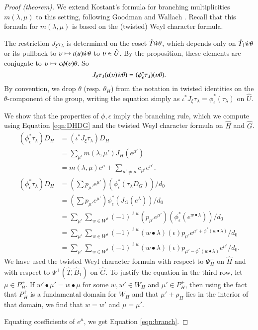 \begin{proof}[Proof (theorem)]
  We extend Kostant's formula for branching multiplicities
  $m(\lambda,\mu)$ to this setting, following Goodman and Wallach
  \cite[\S8.2.2]{goodman}.  Recall that this formula for
  $m(\lambda,\mu)$ is based on the (twisted) Weyl character formula.

  The restriction $J_\xi\tau_\lambda$ is determined on the coset $\hat
  T\dot w \theta$, which depends only on $\hat T_1 \dot w\theta$ or its
  pullback to $\upsilon\mapsto \iota(u)\dot w\theta$ to $\upsilon\in \hat U$.  By
  the proposition, these elements are conjugate to $\upsilon\mapsto
  \epsilon\phi(\upsilon)\theta$.  So
\[
J_\xi\tau_\lambda (\iota(\upsilon)\dot w \theta) = (\phi_\epsilon^*\tau_\lambda)(\upsilon\theta).
\]
By convention, we drop $\theta$ (resp. $\theta_H$) from the notation
in twisted identities on the $\theta$-component of the group, writing
the equation simply as $\iota^*J_\xi\tau_\lambda =
\phi_\epsilon^*(\tau_\lambda)$ on $\hat U$.

We show that the properties of $\phi,\epsilon$ imply the branching
rule, which we compute using Equation \ref{eqn:DHDG} and the twisted
Weyl character formula on $\hat H$ and $\hat G$.
\begin{align*}
(\phi^*_\epsilon\tau_\lambda) D_H 
 &= (\iota^*J_\xi\tau_\lambda) D_H\\
 &= \sum_{\mu'} m(\lambda,{\mu'}) J_H(e^{\mu'})\\
  &= m(\lambda,\mu)e^\mu + \sum_{\mu'\ne\mu} c_{\mu'} e^{\mu'}.\\
(\phi^*_\epsilon\tau_\lambda) D_H 
  &= (\sum p_{\mu'} e^{\mu'})(\phi^*_\epsilon(\tau_\lambda D_{G})) /d_0\\
  &= (\sum p_{\mu'} e^{\mu'}) \phi^*_\epsilon(J_G(e^\lambda)) /d_0\\
  &= \sum_{\mu'} \sum_{w\in W^\theta} (-1)^{\ell w} 
  (p_{\mu'} e^{\mu'}) (\phi^*_\epsilon (e^{w\bullet \lambda})) /d_0\\
  &= \sum_{\mu'} \sum_{w\in W^\theta} (-1)^{\ell w}  
 ({w\bullet\lambda})(\epsilon) p_{\mu'}
e^{\mu'+\phi^*(w\bullet \lambda)} /d_0\\
  &= \sum_{\mu'} \sum_{w\in W^\theta} 
(-1)^{\ell w} ({w\bullet\lambda})(\epsilon) 
 p_{\mu' - \phi^*({w\bullet \lambda})} e^{\mu'} /d_0.
\end{align*}
We have used the twisted Weyl character formula with respect to
$\Psi^+_H$ on $\hat H$ and with respect to $\Psi^+(\hat T,\hat B_1)$
on $\hat G$.  To justify the equation in the third row, let $\mu\in
P_H^+$.  If $w'\bullet \mu' = w\bullet \mu$ for some $w,w'\in W_H$ and
$\mu'\in P_H^+$, then using the fact that $P_H^+$ is a fundamental
domain for $W_H$ and that $\mu'+\rho_H$ lies in the interior of that
domain, we find that $w=w'$ and $\mu=\mu'$.

Equating coefficients of $e^\mu$, we get Equation \ref{eqn:branch}.
\end{proof}

